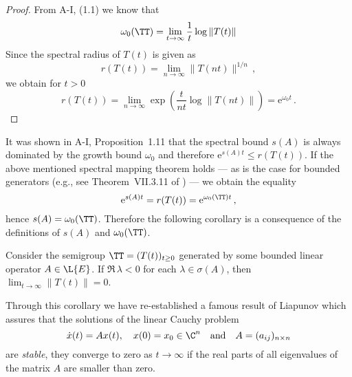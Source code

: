 \begin{proof}
From A-I, (1.1) we know that
\[
    \omega_{0}(\TT) = \lim_{t \to \infty} \frac{1}{t} \log \|T(t)\|
\]
Since the spectral radius of $T(t)$ is given as
\[
    r(T(t)) = \lim_{n \to \infty} \|T(nt)\|^{1/n}\,,
\]
we obtain for $t > 0$
\[
    r(T(t)) = \lim_{n \to \infty} \exp\left(\frac{t}{nt} \log \|T(nt)\|\right) = \mathrm{e}^{\omega_{0} t}\,.
\]
\end{proof}
It was shown in A-I, Proposition~1.11 that the spectral bound $s(A)$ is always dominated by the growth bound $\omega_{0}$ and therefore $\mathrm{e}^{s(A)t} \leq r(T(t))$.
If the above mentioned spectral mapping theorem holds --- as is the case for bounded generators (e.g., see Theorem~VII.3.11 of \citet{dunfordschwartz:1958}) --- we obtain the equality
\[
    \mathrm{e}^{s(A)t} = r(T(t)) = \mathrm{e}^{\omega_{0}(\TT) t}\,,
\]
hence $s(A) = \omega_{0}(\TT)$.
Therefore the following corollary is a consequence of the definitions of $s(A)$ and $\omega_{0}(\TT)$.
\begin{corollary}\label{cor:a3-1.2}
Consider the semigroup $\TT = (T(t))_{t \geq 0}$ generated by some bounded linear operator $A \in \L{E}$.
If $\Re\,\lambda < 0$ for each $\lambda \in \sigma(A)$, then $\lim_{t \to \infty}\|T(t)\| = 0$.
\end{corollary}
Through this corollary we have re-established a famous result of Liapunov which assures that the solutions of the linear Cauchy problem
\[
    \dot{x}(t) = Ax(t), \quad x(0) = x_{0} \in \C^{n} \quad \text{and} \quad A = (a_{ij})_{n\times n}
\]
are \emph{stable}, \ie they converge to zero as $t \to \infty$ if the real parts of all eigenvalues of the matrix $A$ are smaller than zero.

